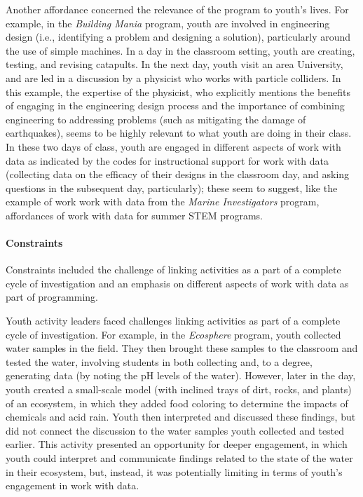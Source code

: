 \documentclass[]{book}
\let\oldparagraph\paragraph
\renewcommand{\paragraph}[1]{\oldparagraph{#1}\mbox{}}
\theoremstyle{definition}
\theoremstyle{definition}
\theoremstyle{definition}
\theoremstyle{remark}
\begin{document}
Another affordance concerned the relevance of the program to youth's
lives. For example, in the \emph{Building Mania} program, youth are
involved in engineering design (i.e., identifying a problem and
designing a solution), particularly around the use of simple machines.
In a day in the classroom setting, youth are creating, testing, and
revising catapults. In the next day, youth visit an area University, and
are led in a discussion by a physicist who works with particle
colliders. In this example, the expertise of the physicist, who
explicitly mentions the benefits of engaging in the engineering design
process and the importance of combining engineering to addressing
problems (such as mitigating the damage of earthquakes), seems to be
highly relevant to what youth are doing in their class. In these two
days of class, youth are engaged in different aspects of work with data
as indicated by the codes for instructional support for work with data
(collecting data on the efficacy of their designs in the classroom day,
and asking questions in the subsequent day, particularly); these seem to
suggest, like the example of work work with data from the \emph{Marine
Investigators} program, affordances of work with data for summer STEM
programs.

\paragraph{Constraints}\label{constraints}

Constraints included the challenge of linking activities as a part of a
complete cycle of investigation and an emphasis on different aspects of
work with data as part of programming.

Youth activity leaders faced challenges linking activities as part of a
complete cycle of investigation. For example, in the \emph{Ecosphere}
program, youth collected water samples in the field. They then brought
these samples to the classroom and tested the water, involving students
in both collecting and, to a degree, generating data (by noting the pH
levels of the water). However, later in the day, youth created a
small-scale model (with inclined trays of dirt, rocks, and plants) of an
ecosystem, in which they added food coloring to determine the impacts of
chemicals and acid rain. Youth then interpreted and discussed these
findings, but did not connect the discussion to the water samples youth
collected and tested earlier. This activity presented an opportunity for
deeper engagement, in which youth could interpret and communicate
findings related to the state of the water in their ecosystem, but,
instead, it was potentially limiting in terms of youth's engagement in
work with data.
\end{document}

